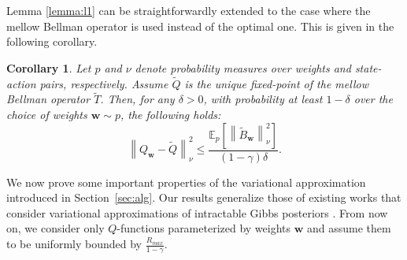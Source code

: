 \documentclass{article}
\newtheorem{corollary}{Corollary}
\newcommand{\wt}[1]{\widetilde{#1}}
\newcommand{\norm}[1]{\left\lVert #1 \right\rVert}
\begin{document}
Lemma \ref{lemma:l1} can be straightforwardly extended to the case where the mellow Bellman operator is used instead of the optimal one. This is given in the following corollary.

\begin{corollary}\label{cor:diff-q}
Let $p$ and $\nu$ denote probability measures over weights and state-action pairs, respectively. Assume $\wt{Q}$ is the unique fixed-point of the mellow Bellman operator $\wt{T}$. Then, for any $\delta > 0$, with probability at least $1 - \delta$ over the choice of weights $\bm{w} \sim p$, the following holds:
\begin{equation}
\norm{Q_{\bm{w}} - \wt{Q}}_{\nu}^2 \leq \frac{\mathbb{E}_p\left[ \norm{\wt{B}_{\bm{w}}}_{\nu}^2 \right]}{(1-\gamma)\delta}.
\end{equation}
\end{corollary}

We now prove some important properties of the variational approximation introduced in Section~\ref{sec:alg}. Our results generalize those of existing works that consider variational approximations of intractable Gibbs posteriors \cite{alquier2016properties,cottet20181}. From now on, we consider only $Q$-functions parameterized by weights $\bm{w}$ and assume them to be uniformly bounded by $\frac{R_{max}}{1-\gamma}$. 
\end{document}
